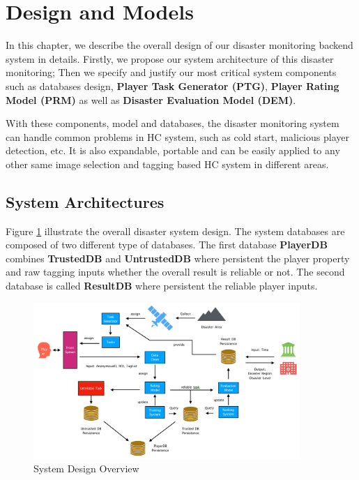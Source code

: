 \section{Design and Models}

In this chapter, we describe the overall design of our disaster monitoring backend system in details.
Firstly, we propose our system architecture of this disaster monitoring;
Then we specify and justify our most critical system components such as databases design, 
\textbf{Player Task Generator (PTG)\label{idx:ptg}}, \textbf{Player Rating Model (PRM)\label{idx:prm}} 
as well as \textbf{Disaster Evaluation Model (DEM)\label{idx:dem}}.

With these components, model and databases, the disaster monitoring system can handle
common problems in HC system, such as cold start, malicious player detection, etc. 
It is also expandable, portable and can be easily applied to any other same image selection 
and tagging based HC system in different areas.

\subsection{System Architectures}

Figure \ref{fig:arch} illustrate the overall disaster system design.
The system databases are composed of two different type of databases. 
The first database \textbf{PlayerDB} combines \textbf{TrustedDB} and \textbf{UntrustedDB} 
where persistent the player property and raw tagging inputs whether the overall result is reliable or not.
The second database is called \textbf{ResultDB} where persistent the reliable player inputs.

\begin{figure}[htp]
\centering
\includegraphics[width=0.9\textwidth]{figures/system2}
\caption{System Design Overview}
\label{fig:arch}
\end{figure}

